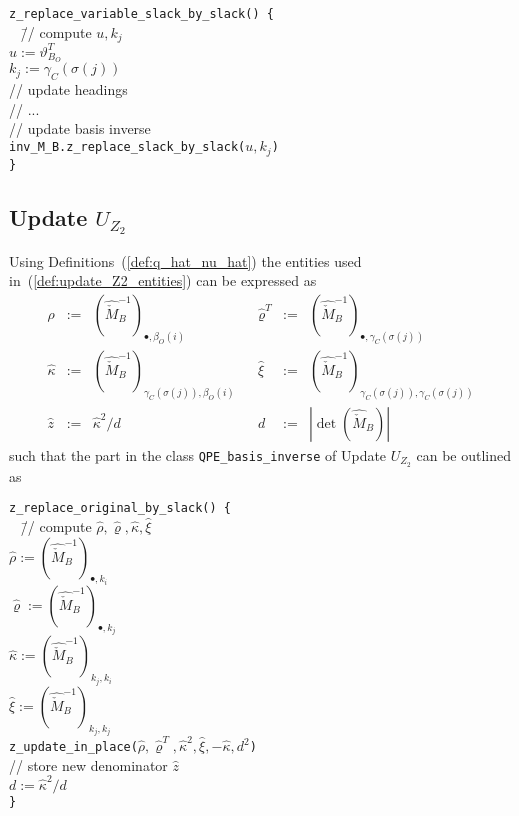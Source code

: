 \documentclass[a4paper]{article}
\begin{document}
\begin{tabbing}
\texttt{z\_replace\_variable\_slack\_by\_slack() \{} \\
\texttt{  } \= // compute $u, k_{j}$ \\
\> \texttt{$u:=\vartheta_{B_{O}}^{T}$} \\
\> \texttt{$k_{j}:=\gamma_{C}(\sigma(j))$} \\
\> // update headings \\
\> // ... \\
\> // update basis inverse \\
\> \texttt{inv\_M\_B.z\_replace\_slack\_by\_slack($u, k_{j}$)}
\\
\texttt{\}}
\end{tabbing}


\subsection{Update $U_{Z_{2}}$}
Using Definitions~(\ref{def:q_hat_nu_hat}) the entities used
in~(\ref{def:update_Z2_entities}) can be expressed as
\begin{equation}
\label{def:update_Z2_entities_prep}
\begin{array}{rclcrcl}
\hat{\rho}
&:=&
\left(
  \hat{\check{M}}_{B}^{-1}
\right)_{\bullet, \beta_{O}(i)}
&&
\hat{\varrho}^{T}
&:=&
\left(
  \hat{\check{M}}_{B}^{-1}
\right)_{\bullet, \gamma_{C}(\sigma(j))}
\\
\hat{\kappa}
&:=&
\left(
  \hat{\check{M}}_{B}^{-1}
\right)_{\gamma_{C}(\sigma(j)), \beta_{O}(i)}
&&
\hat{\xi}
&:=&
\left(
  \hat{\check{M}}_{B}^{-1}
\right)_{\gamma_{C}(\sigma(j)), \gamma_{C}(\sigma(j))}
\\
\hat{z}
&:=&
\hat{\kappa}^{2}/d
&&
d
&:=&
\left|\det(\hat{\check{M}}_{B})\right|
\end{array}
\end{equation}
such that the part in the class \texttt{QPE\_basis\_inverse} of
Update $U_{Z_{2}}$ can be outlined as
\begin{tabbing}
\texttt{z\_replace\_original\_by\_slack() \{} \\
\texttt{  } \= // compute $\hat{\rho}, \hat{\varrho}, \hat{\kappa},
\hat{\xi}$ \\
\> \texttt{$\hat{\rho}:=
  \left(\hat{\check{M}}_{B}^{-1}\right)_{\bullet, k_{i}}$} \\
\> \texttt{$\hat{\varrho}:=
  \left(\hat{\check{M}}_{B}^{-1}\right)_{\bullet, k_{j}}$} \\
\> \texttt{$\hat{\kappa}:=
  \left(\hat{\check{M}}_{B}^{-1}\right)_{k_{j}, k_{i}}$} \\
\> \texttt{$\hat{\xi}:=
  \left(\hat{\check{M}}_{B}^{-1}\right)_{k_{j}, k_{j}}$} \\    
\> \texttt{z\_update\_in\_place($\hat{\rho}, \hat{\varrho}^{T},
\hat{\kappa}^{2}, \hat{\xi}, -\hat{\kappa}, d^{2}$)} \\
\> // store new denominator $\hat{z}$ \\
\> \texttt{$d:=\hat{\kappa}^{2}/d$} \\
\texttt{\}}
\end{tabbing}
\end{document}
